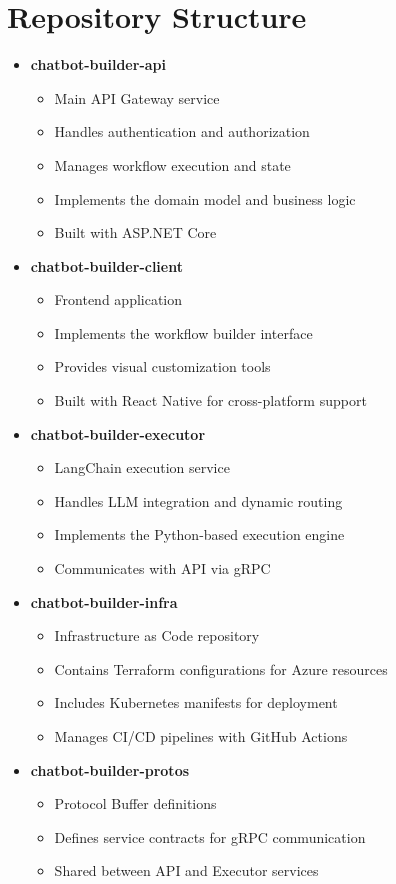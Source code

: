 \documentclass[12pt, a4paper]{report}
\begin{document}
\section{Repository Structure}
\begin{itemize}
    \item \textbf{chatbot-builder-api}
    \begin{itemize}
        \item Main API Gateway service
        \item Handles authentication and authorization
        \item Manages workflow execution and state
        \item Implements the domain model and business logic
        \item Built with ASP.NET Core
    \end{itemize}
    
    \item \textbf{chatbot-builder-client}
    \begin{itemize}
        \item Frontend application
        \item Implements the workflow builder interface
        \item Provides visual customization tools
        \item Built with React Native for cross-platform support
    \end{itemize}
    
    \item \textbf{chatbot-builder-executor}
    \begin{itemize}
        \item LangChain execution service
        \item Handles LLM integration and dynamic routing
        \item Implements the Python-based execution engine
        \item Communicates with API via gRPC
    \end{itemize}
    
    \item \textbf{chatbot-builder-infra}
    \begin{itemize}
        \item Infrastructure as Code repository
        \item Contains Terraform configurations for Azure resources
        \item Includes Kubernetes manifests for deployment
        \item Manages CI/CD pipelines with GitHub Actions
    \end{itemize}
    
    \item \textbf{chatbot-builder-protos}
    \begin{itemize}
        \item Protocol Buffer definitions
        \item Defines service contracts for gRPC communication
        \item Shared between API and Executor services
    \end{itemize}
\end{itemize}
\end{document}
